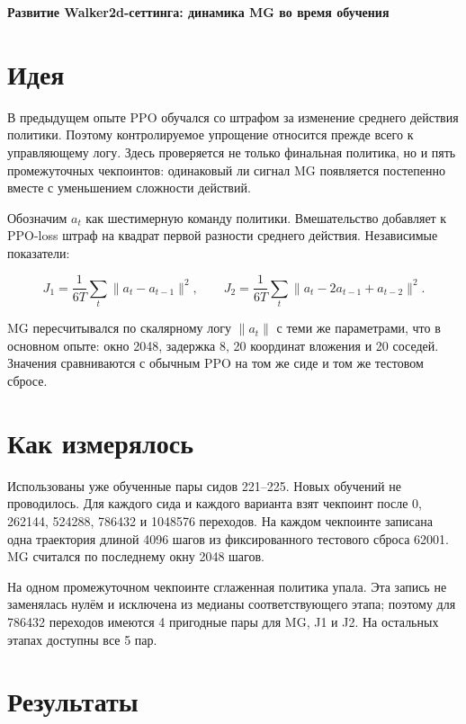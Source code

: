 \documentclass[10pt,a4paper]{article}
\begin{document}
{\Large\bfseries Развитие Walker2d-сеттинга: динамика MG во время обучения}\par\medskip

\section*{Идея}

В предыдущем опыте PPO обучался со штрафом за изменение среднего действия политики. Поэтому контролируемое упрощение относится прежде всего к управляющему логу. Здесь проверяется не только финальная политика, но и пять промежуточных чекпоинтов: одинаковый ли сигнал MG появляется постепенно вместе с уменьшением сложности действий.

Обозначим $a_t$ как шестимерную команду политики. Вмешательство добавляет к PPO-loss штраф на квадрат первой разности среднего действия. Независимые показатели:

\[
J_1=\frac{1}{6T}\sum_t\|a_t-a_{t-1}\|^2,
\qquad
J_2=\frac{1}{6T}\sum_t\|a_t-2a_{t-1}+a_{t-2}\|^2.
\]

MG пересчитывался по скалярному логу $\|a_t\|$ с теми же параметрами, что в основном опыте: окно 2048, задержка 8, 20 координат вложения и 20 соседей. Значения сравниваются с обычным PPO на том же сиде и том же тестовом сбросе.

\section*{Как измерялось}

Использованы уже обученные пары сидов 221--225. Новых обучений не проводилось. Для каждого сида и каждого варианта взят чекпоинт после 0, 262144, 524288, 786432 и 1048576 переходов. На каждом чекпоинте записана одна траектория длиной 4096 шагов из фиксированного тестового сброса 62001. MG считался по последнему окну 2048 шагов.

На одном промежуточном чекпоинте сглаженная политика упала. Эта запись не заменялась нулём и исключена из медианы соответствующего этапа; поэтому для 786432 переходов имеются 4 пригодные пары для MG, J1 и J2. На остальных этапах доступны все 5 пар.

\section*{Результаты}
\end{document}
